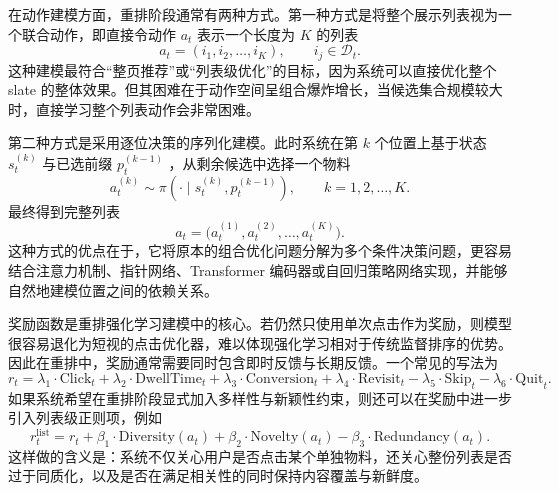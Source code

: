\documentclass[UTF8]{ctexart}
\begin{document}
在动作建模方面，重排阶段通常有两种方式。第一种方式是将整个展示列表视为一个联合动作，即直接令动作 \(a_t\) 表示一个长度为 \(K\) 的列表
\[ a_t=(i_1,i_2,\dots,i_K), \qquad i_j\in\mathcal{D}_t . \]
这种建模最符合``整页推荐''或``列表级优化''的目标，因为系统可以直接优化整个 slate 的整体效果。但其困难在于动作空间呈组合爆炸增长，当候选集合规模较大时，直接学习整个列表动作会非常困难。

第二种方式是采用逐位决策的序列化建模。此时系统在第 \(k\) 个位置上基于状态 \(s_t^{(k)}\) 与已选前缀 \(p_t^{(k-1)}\) ，从剩余候选中选择一个物料
\[ a_t^{(k)}\sim \pi\!\left(\cdot \mid s_t^{(k)},p_t^{(k-1)}\right),\qquad k=1,2,\dots,K . \]
最终得到完整列表
\[ a_t=\bigl(a_t^{(1)},a_t^{(2)},\dots,a_t^{(K)}\bigr). \]
这种方式的优点在于，它将原本的组合优化问题分解为多个条件决策问题，更容易结合注意力机制、指针网络、Transformer 编码器或自回归策略网络实现，并能够自然地建模位置之间的依赖关系。

奖励函数是重排强化学习建模中的核心。若仍然只使用单次点击作为奖励，则模型很容易退化为短视的点击优化器，难以体现强化学习相对于传统监督排序的优势。因此在重排中，奖励通常需要同时包含即时反馈与长期反馈。一个常见的写法为
\[ r_t=\lambda_1 \cdot \mathrm{Click}_t+\lambda_2 \cdot \mathrm{DwellTime}_t+\lambda_3 \cdot \mathrm{Conversion}_t+\lambda_4 \cdot \mathrm{Revisit}_t-\lambda_5 \cdot \mathrm{Skip}_t-\lambda_6 \cdot \mathrm{Quit}_t . \]
如果系统希望在重排阶段显式加入多样性与新颖性约束，则还可以在奖励中进一步引入列表级正则项，例如
\[ r_t^{\mathrm{list}}=r_t+\beta_1 \cdot \mathrm{Diversity}(a_t)+\beta_2 \cdot \mathrm{Novelty}(a_t)-\beta_3 \cdot \mathrm{Redundancy}(a_t). \]
这样做的含义是：系统不仅关心用户是否点击某个单独物料，还关心整份列表是否过于同质化，以及是否在满足相关性的同时保持内容覆盖与新鲜度。
\end{document}
